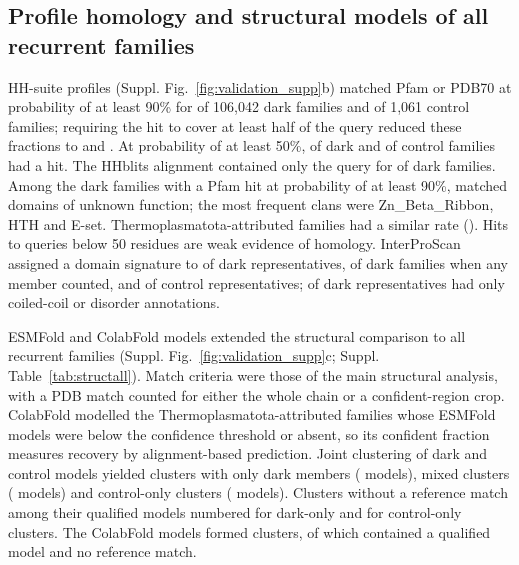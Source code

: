 \subsection*{Profile homology and structural models of all recurrent families}
HH-suite profiles (Suppl. Fig.~\ref{fig:validation_supp}b) matched Pfam or PDB70 at probability of at least 90\% for  of 106,042 dark families and  of 1,061 control families; requiring the hit to cover at least half of the query reduced these fractions to  and . At probability of at least 50\%,  of dark and  of control families had a hit. The HHblits alignment contained only the query for  of dark families. Among the  dark families with a Pfam hit at probability of at least 90\%,  matched domains of unknown function; the most frequent clans were Zn\_Beta\_Ribbon, HTH and E-set. Thermoplasmatota-attributed families had a similar rate (). Hits to queries below 50 residues are weak evidence of homology. InterProScan assigned a domain signature to  of dark representatives,  of dark families when any member counted, and  of control representatives;  of dark representatives had only coiled-coil or disorder annotations.

ESMFold and ColabFold models extended the structural comparison to all recurrent families (Suppl. Fig.~\ref{fig:validation_supp}c; Suppl. Table~\ref{tab:structall}). Match criteria were those of the main structural analysis, with a PDB match counted for either the whole chain or a confident-region crop. ColabFold modelled the Thermoplasmatota-attributed families whose ESMFold models were below the confidence threshold or absent, so its confident fraction measures recovery by alignment-based prediction. Joint clustering of dark and control models yielded  clusters with only dark members ( models),  mixed clusters ( models) and  control-only clusters ( models). Clusters without a reference match among their qualified models numbered  for dark-only and  for control-only clusters. The  ColabFold models formed  clusters, of which  contained a qualified model and no reference match.

